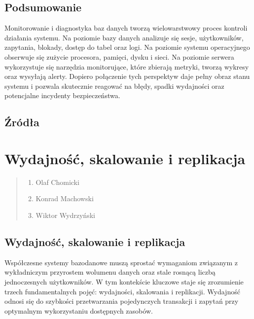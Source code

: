 \documentclass[letterpaper,10pt,polish]{sphinxmanual}
\begin{document}
\subsection{Podsumowanie}
\label{\detokenize{rozdzia_u0142_2/rozdzia_u0142_24/index:podsumowanie}}
\sphinxAtStartPar
Monitorowanie i diagnostyka baz danych tworzą wielowarstwowy proces kontroli działania systemu. Na poziomie bazy danych analizuje się sesje, użytkowników, zapytania, blokady, dostęp do tabel oraz logi. Na poziomie systemu operacyjnego obserwuje się zużycie procesora, pamięci, dysku i sieci. Na poziomie serwera wykorzystuje się narzędzia monitorujące, które zbierają metryki, tworzą wykresy oraz wysyłają alerty. Dopiero połączenie tych perspektyw daje pełny obraz stanu systemu i pozwala skutecznie reagować na błędy, spadki wydajności oraz potencjalne incydenty bezpieczeństwa.


\subsection{Źródła}
\label{\detokenize{rozdzia_u0142_2/rozdzia_u0142_24/index:zrodla}}
\sphinxstepscope


\section{Wydajność, skalowanie i replikacja}
\label{\detokenize{rozdzia_u0142_2/rozdzia_u0142_25/index:wydajnosc-skalowanie-i-replikacja}}\label{\detokenize{rozdzia_u0142_2/rozdzia_u0142_25/index::doc}}\begin{quote}\begin{description}
\begin{enumerate}
%
\item {} 
\sphinxAtStartPar
Olaf Chomicki

\item {} 
\sphinxAtStartPar
Konrad Machowski

\item {} 
\sphinxAtStartPar
Wiktor Wydrzyński

\end{enumerate}

\end{description}\end{quote}


\subsection{Wydajność, skalowanie i replikacja}
\label{\detokenize{rozdzia_u0142_2/rozdzia_u0142_25/index:id1}}
\sphinxAtStartPar
Współczesne systemy bazodanowe muszą sprostać wymaganiom związanym z wykładniczym przyrostem wolumenu danych oraz stale rosnącą liczbą jednoczesnych użytkowników. W tym kontekście kluczowe staje się zrozumienie trzech fundamentalnych pojęć: wydajności, skalowania i replikacji. Wydajność odnosi się do szybkości przetwarzania pojedynczych transakcji i zapytań przy optymalnym wykorzystaniu dostępnych zasobów.
\end{document}
